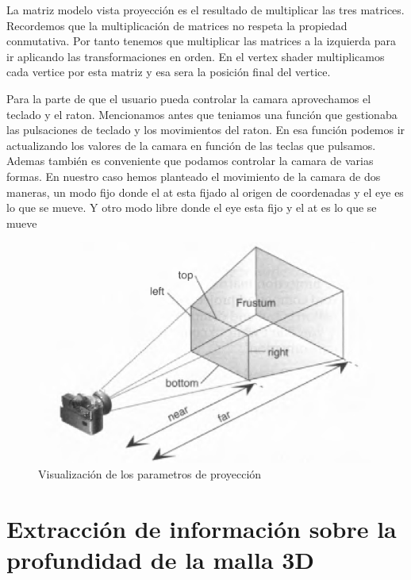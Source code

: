La matriz modelo vista proyección es el resultado de multiplicar las tres matrices. Recordemos que la multiplicación de matrices no respeta la propiedad conmutativa. Por tanto tenemos que multiplicar las matrices a la izquierda para ir aplicando las transformaciones en orden.
En el vertex shader multiplicamos cada vertice por esta matriz y esa sera la posición final del vertice.

Para la parte de que el usuario pueda controlar la camara aprovechamos el teclado y el raton. Mencionamos antes que teniamos una función que gestionaba las pulsaciones de teclado y los movimientos del raton.
En esa función podemos ir actualizando los valores de la camara en función de las teclas que pulsamos. Ademas también es conveniente que podamos controlar la camara de varias formas. En nuestro caso hemos planteado el movimiento de la camara
de dos maneras, un modo fijo donde el at esta fijado al origen de coordenadas y el eye es lo que se mueve. Y otro modo libre donde el eye esta fijo y el at es lo que se mueve



\begin{figure}
    \centering
    \includegraphics{imagenes/frustrum.png}
    \caption{Visualización de los parametros de proyección}
\end{figure}




\section{Extracción de información sobre la profundidad de la malla 3D}

